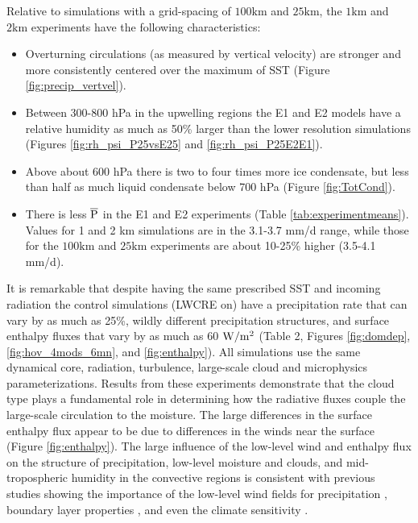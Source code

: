 \documentclass[draft]{agujournal2019}
\begin{document}
{Relative to simulations with a grid-spacing of $100 \textrm{km}$ and $25 \textrm{km}$, the $1 \textrm{km}$ and 
$2 \textrm{km}$ experiments have the following characteristics: 
\begin{itemize}
  \item Overturning circulations (as measured by vertical velocity) are stronger and more consistently centered 
  over the maximum of SST (Figure \ref{fig:precip_vertvel}).  
  \item   
  Between 300-800 hPa in the upwelling regions the E1 and E2 
  models have a relative humidity 
  as much as 50\% larger than the lower resolution simulations (Figures \ref{fig:rh_psi_P25vsE25} and \ref{fig:rh_psi_P25E2E1}).  
  \item Above about 600 hPa there is two to four times more ice condensate, but less than half as much liquid condensate below 700 hPa (Figure \ref{fig:TotCond}).
  \item There is less $\overline{\rm{P}}$ in the E1 and E2 experiments (Table \ref{tab:experimentmeans}).  Values for 1 and 2 km simulations are in the 3.1-3.7 mm/d range, while those 
  for the $100 \textrm{km}$ and $25 \textrm{km}$ experiments are about 10-25\% higher (3.5-4.1 mm/d).  
  \end{itemize}

It is remarkable that despite having the same prescribed SST and incoming radiation
the control simulations (LWCRE on) have a precipitation rate  that can vary by as much as 
25\%, wildly different precipitation structures, and surface enthalpy fluxes that vary by as much as 
60 $\rm{W/m^2}$ (Table 2, Figures \ref{fig:domdep}, \ref{fig:hov_4mods_6mn}, and \ref{fig:enthalpy}).
All simulations use the same dynamical core, radiation, turbulence, large-scale cloud and microphysics parameterizations.  
Results from these experiments demonstrate that the cloud type
plays a fundamental role in determining how the radiative fluxes couple
the large-scale circulation to the moisture.  The large differences in the surface enthalpy flux
appear to be due to differences in the winds near the surface (Figure \ref{fig:enthalpy}).  
The large influence of the low-level wind  and enthalpy flux on the structure of precipitation, 
low-level moisture and clouds, and mid-tropospheric humidity in the convective regions is 
consistent with previous studies showing the importance of the low-level wind fields for precipitation 
\cite{Wofsy_Kuang_2012, Fermepin_Bony_2014}, boundary layer properties \cite{Raymond_1994}, and even the climate 
sensitivity \cite{Silvers_etal_2016}.  

}
\end{document}
